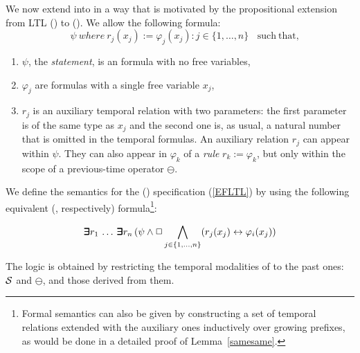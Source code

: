 \vspace{1.5ex}
We now extend \FLTL{} into \EFLTL{} in a way that is motivated by the  propositional extension from LTL (\PLTL{}) to \ELTL{} (\EPLTL{}). We allow the following formula:
\begin{equation}
\label{EFLTL}
\ \ \ \ \ \psi \mathit{\ where\ } r_j  ( x_j ) := 
\varphi_j (x_j) : j \in \{ 1 , \ldots , n \} \mathrm{\ \ \ \     such\ that,}
\end{equation}
\begin{enumerate}
\item $\psi$, the {\em statement}, is an \FLTL{} formula with
no free variables, 
\item $\varphi_j$ are \PFLTL{} formulas with a single
free variable $x_j$,
\item $r_j$ is an auxiliary temporal relation with two parameters: the first parameter is of the same 
type as $x_j$ and the second one is, as usual,
a natural number that is omitted in the temporal formulas. 
An auxiliary relation $r_j$ can appear within $\psi$. They can also appear in $\varphi_k$ of a {\em rule} $r_k := \varphi_k$, but only within the
scope
of a previous-time operator $\ominus$. 
\end{enumerate}

\noindent
We define the semantics for the \EFLTL{} (\EPFLTL{})
specification (\ref{EFLTL}) 
by using the following equivalent
\QFLTL{} (\QPFLTL{}, respectively) formula\footnote{ Formal semantics 
can also be given by constructing a set of temporal relations extended
with the auxiliary ones
inductively over growing prefixes, as would be done in a detailed proof of Lemma~\ref{samesame}.}:

\begin{equation} \label{equiv}
\bm{\exists}\kern-0.6em\bm{\exists} r_1  \, \ldots \, \bm{\exists}\kern-0.6em\bm{\exists} r_n \,  ( \psi \wedge \Box \bigwedge_{j \in \{ 1, \ldots , n\}} (r_j ( x_j )  \leftrightarrow 
\varphi_i ( x_j) )
\end{equation}

The logic \EPFLTL{} is obtained by restricting the temporal modalities of \EFLTL{} to the past ones:
${\cal S}$ and $\ominus$, and those derived from them.

